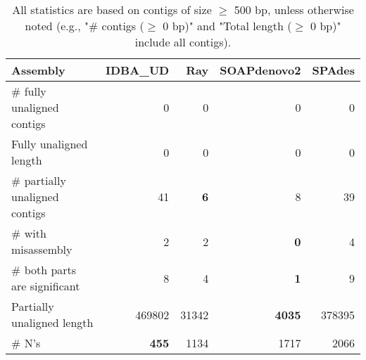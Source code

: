 \documentclass[12pt,a4paper]{article}
\begin{document}
\begin{table}[ht]
\begin{center}
\caption{All statistics are based on contigs of size $\geq$ 500 bp, unless otherwise noted (e.g., "\# contigs ($\geq$ 0 bp)" and "Total length ($\geq$ 0 bp)" include all contigs).}
\begin{tabular}{|l*{4}{|r}|}
\hline
Assembly & IDBA\_UD & Ray & SOAPdenovo2 & SPAdes \\ \hline
\# fully unaligned contigs & 0 & 0 & 0 & 0 \\ \hline
Fully unaligned length & 0 & 0 & 0 & 0 \\ \hline
\# partially unaligned contigs & 41 & {\bf 6} & 8 & 39 \\ \hline
\hspace{5mm}\# with misassembly & 2 & 2 & {\bf 0} & 4 \\ \hline
\hspace{5mm}\# both parts are significant & 8 & 4 & {\bf 1} & 9 \\ \hline
Partially unaligned length & 469802 & 31342 & {\bf 4035} & 378395 \\ \hline
\# N's & {\bf 455} & 1134 & 1717 & 2066 \\ \hline
\end{tabular}
\end{center}
\end{table}
\end{document}
